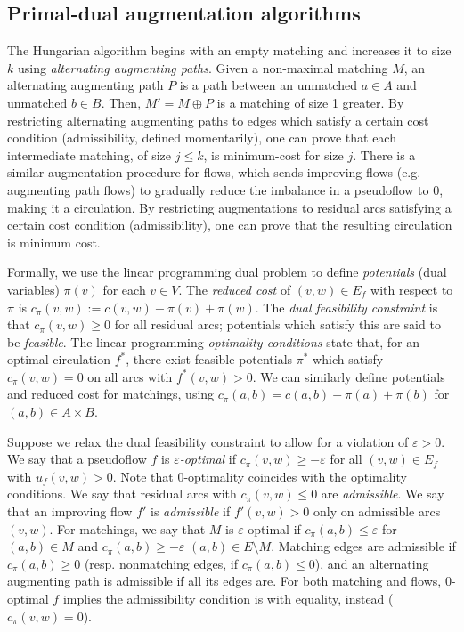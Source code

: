 \documentclass[11pt]{article}
\def\eps{\varepsilon}
\theoremstyle{plain}
\begin{document}
\subsection{Primal-dual augmentation algorithms}

The Hungarian algorithm begins with an empty matching and increases it to size
$k$ using \emph{alternating augmenting paths}.
Given a non-maximal matching $M$, an alternating augmenting path $P$ is a path
between an unmatched $a \in A$ and unmatched $b \in B$.
Then, $M' = M \oplus P$ is a matching of size 1 greater.
By restricting alternating augmenting paths to edges which satisfy a certain
cost condition (admissibility, defined momentarily), one can prove that each
intermediate matching, of size $j \leq k$, is minimum-cost for size $j$.
There is a similar augmentation procedure for flows, which sends improving
flows (e.g. augmenting path flows) to gradually reduce the imbalance in a
pseudoflow to 0, making it a circulation.
By restricting augmentations to residual arcs satisfying a certain cost
condition (admissibility), one can prove that the resulting circulation is
minimum cost.

Formally, we use the linear programming dual problem to define
\emph{potentials} (dual variables) $\pi(v)$ for each $v \in V$.
The \emph{reduced cost} of $(v, w) \in E_f$ with respect to $\pi$ is
$c_\pi(v, w) := c(v, w) - \pi(v) + \pi(w)$.
The \emph{dual feasibility constraint} is that $c_\pi(v, w) \geq 0$ for all
residual arcs; potentials which satisfy this are said to be \emph{feasible}.
The linear programming \emph{optimality conditions} state that, for an optimal
circulation $f^*$, there exist feasible potentials $\pi^*$ which satisfy
$c_\pi(v, w) = 0$ on all arcs with $f^*(v, w) > 0$.
We can similarly define potentials and reduced cost for matchings, using
$c_\pi(a, b) = c(a, b) - \pi(a) + \pi(b)$ for $(a, b) \in A \times B$.

Suppose we relax the dual feasibility constraint to allow for a violation of
$\eps > 0$.
We say that a pseudoflow $f$ is \emph{$\eps$-optimal} if
$c_\pi(v, w) \geq -\eps$ for all $(v, w) \in E_f$ with $u_f(v, w) > 0$.
Note that 0-optimality coincides with the optimality conditions.
We say that residual arcs with $c_\pi(v, w) \leq 0$ are \emph{admissible}.
We say that an improving flow $f'$ is \emph{admissible} if $f'(v, w) > 0$
only on admissible arcs $(v, w)$.
For matchings, we say that $M$ is $\eps$-optimal if $c_\pi(a, b) \leq \eps$ for
$(a, b) \in M$ and $c_\pi(a, b) \geq -\eps$ $(a, b) \in E \setminus M$.
Matching edges are admissible if $c_\pi(a, b) \geq 0$ (resp. nonmatching edges,
if $c_\pi(a, b) \leq 0$), and an alternating augmenting path is admissible
if all its edges are.
For both matching and flows, 0-optimal $f$ implies the admissibility condition
is with equality, instead ($c_\pi(v, w) = 0$).
\end{document}
